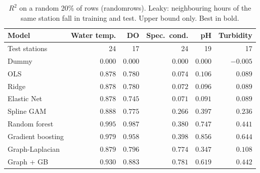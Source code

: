 \documentclass[11pt]{article}
\newcommand{\codeus}{\textunderscore\allowbreak}
\newcommand{\code}[1]{{\ttfamily\let\_\codeus #1}}
\begin{document}
\begin{table}[h]
\centering
\small
\caption{$R^2$ on a random 20\% of rows (\code{random\_rows}). Leaky: neighbouring hours of the same station fall in training and test. Upper bound only. Best in bold.}
\label{tab:split_rows}
\begin{tabular}{l rrrrr}
\toprule
Model & Water temp. & DO & Spec.\ cond. & pH & Turbidity \\
\midrule
Test stations & 24 & 17 & 24 & 19 & 17 \\ \midrule
Dummy               & $0.000$ & $0.000$ & $0.000$ & $0.000$ & $-0.005$ \\
OLS                 & $0.878$ & $0.780$ & $0.074$ & $0.106$ & $0.089$ \\
Ridge               & $0.878$ & $0.780$ & $0.072$ & $0.096$ & $0.089$ \\
Elastic Net         & $0.878$ & $0.745$ & $0.071$ & $0.091$ & $0.089$ \\
Spline GAM          & $0.888$ & $0.775$ & $0.266$ & $0.397$ & $0.236$ \\
Random forest       & $\mathbf{0.995}$ & $\mathbf{0.987}$ & $0.380$ & $0.747$ & $0.441$ \\
Gradient boosting   & $0.979$ & $0.958$ & $0.398$ & $\mathbf{0.856}$ & $\mathbf{0.644}$ \\
Graph-Laplacian     & $0.879$ & $0.796$ & $0.774$ & $0.347$ & $0.108$ \\
Graph + GB          & $0.930$ & $0.883$ & $\mathbf{0.781}$ & $0.619$ & $0.442$ \\
\bottomrule
\end{tabular}
\end{table}
\end{document}
